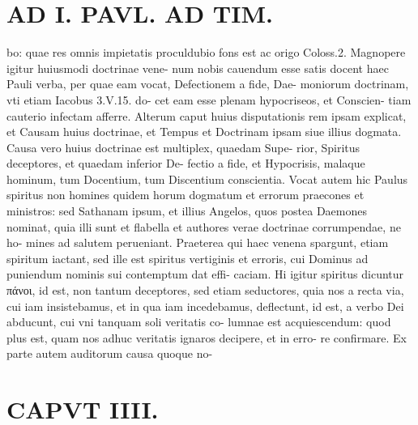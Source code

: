 \documentclass{article}
\begin{document}
\begin{pages}
\section*{AD I. PAVL. AD TIM. }
\marginpar{[ p.1o4 ]}\pstart bo: quae res omnis impietatis proculdubio fons est ac origo Coloss.2. Magnopere igitur huiusmodi doctrinae vene- num nobis cauendum esse satis docent haec Pauli verba, per quae eam vocat, Defectionem a fide, Dae- moniorum doctrinam, vti etiam Iacobus 3.V.15. do- cet eam esse plenam hypocriseos, et Conscien- tiam cauterio infectam afferre. Alterum caput huius disputationis rem ipsam explicat, et Causam huius doctrinae, et Tempus et Doctrinam ipsam siue illius dogmata. Causa vero huius doctrinae est multiplex, quaedam Supe- rior, Spiritus deceptores, et quaedam inferior De- fectio a fide, et Hypocrisis, malaque hominum, tum Docentium, tum Discentium conscientia. Vocat autem hic Paulus spiritus non homines quidem horum dogmatum et errorum praecones et ministros: sed Sathanam ipsum, et illius Angelos, quos postea Daemones nominat, quia illi sunt et flabella et authores verae doctrinae corrumpendae, ne ho- mines ad salutem perueniant. Praeterea qui haec venena spargunt, etiam spiritum iactant, sed ille est spiritus vertiginis et erroris, cui Dominus ad puniendum nominis sui contemptum dat effi- caciam. Hi igitur spiritus dicuntur πάνοι, id est, non tantum deceptores, sed etiam seductores, quia nos a recta via, cui iam insistebamus, et in qua iam incedebamus, deflectunt, id est, a verbo Dei abducunt, cui vni tanquam soli veritatis co- lumnae est acquiescendum: quod plus est, quam nos adhuc veritatis ignaros decipere, et in erro- re confirmare. Ex parte autem auditorum causa quoque no-  \pend
\section*{CAPVT  IIII. }
\marginpar{[ p.185 ]}\pstart {}
{}

\end{pages}
\end{document}
